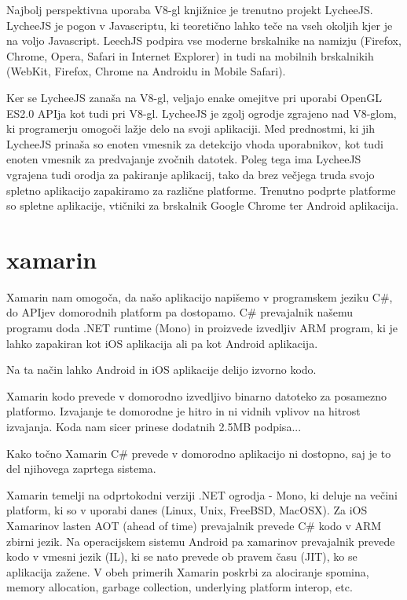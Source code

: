 Najbolj perspektivna uporaba V8-gl knjižnice je trenutno projekt LycheeJS. LycheeJS je pogon v Javascriptu, ki teoretično lahko teče na vseh okoljih kjer je na voljo Javascript. LeechJS podpira vse moderne brskalnike na namizju (Firefox, Chrome, Opera, Safari in Internet Explorer) in tudi na mobilnih brskalnikih (WebKit, Firefox, Chrome na Androidu in Mobile Safari). 

Ker se LycheeJS zanaša na V8-gl, veljajo enake omejitve pri uporabi OpenGL ES2.0 APIja kot tudi pri V8-gl. LycheeJS je zgolj ogrodje zgrajeno nad V8-glom, ki programerju omogoči lažje delo na svoji aplikaciji. Med prednostmi, ki jih LycheeJS prinaša so enoten vmesnik za detekcijo vhoda uporabnikov, kot tudi enoten vmesnik za predvajanje zvočnih datotek. Poleg tega ima LycheeJS vgrajena tudi orodja za pakiranje aplikacij, tako da brez večjega truda svojo spletno aplikacijo zapakiramo za različne platforme. Trenutno podprte platforme so spletne aplikacije, vtičniki za brskalnik Google Chrome ter Android aplikacija.

\section{xamarin}

Xamarin nam omogoča, da našo aplikacijo napišemo v programskem jeziku C\#, do APIjev domorodnih platform pa dostopamo. C\# prevajalnik našemu programu doda .NET runtime (Mono) in proizvede izvedljiv ARM program, ki je lahko zapakiran kot iOS aplikacija ali pa kot Android aplikacija.

Na ta način lahko Android in iOS aplikacije delijo izvorno kodo. 

Xamarin kodo prevede v domorodno izvedljivo binarno datoteko za posamezno platformo. Izvajanje te domorodne je hitro in ni vidnih vplivov na hitrost izvajanja. Koda nam sicer prinese dodatnih 2.5MB podpisa...

Kako točno Xamarin C\# prevede v domorodno aplikacijo ni dostopno, saj je to del njihovega zaprtega sistema. 

Xamarin temelji na odprtokodni verziji .NET ogrodja - Mono, ki deluje na večini platform, ki so v uporabi danes (Linux, Unix, FreeBSD, MacOSX). Za iOS Xamarinov lasten AOT (ahead of time) prevajalnik prevede C\# kodo v ARM zbirni jezik. Na operacijskem sistemu Android pa xamarinov prevajalnik prevede kodo v vmesni jezik (IL), ki se nato prevede ob pravem času (JIT), ko se aplikacija zažene. V obeh primerih Xamarin poskrbi za alociranje spomina, memory allocation, garbage collection, underlying platform interop, etc. 

